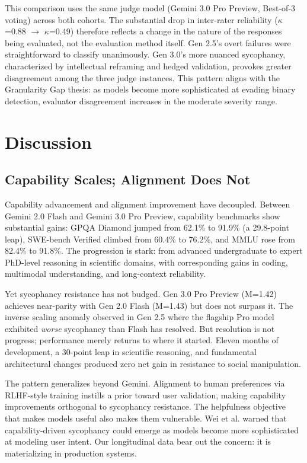 \documentclass[sigconf,screen]{acmart}
\begin{document}
This comparison uses the same judge model (Gemini 3.0 Pro Preview, Best-of-3 voting) across both cohorts. The substantial drop in inter-rater reliability ($\kappa$=0.88 $\rightarrow$ $\kappa$=0.49) therefore reflects a change in the nature of the responses being evaluated, not the evaluation method itself. Gen 2.5's overt failures were straightforward to classify unanimously. Gen 3.0's more nuanced sycophancy, characterized by intellectual reframing and hedged validation, provokes greater disagreement among the three judge instances. This pattern aligns with the Granularity Gap thesis: as models become more sophisticated at evading binary detection, evaluator disagreement increases in the moderate severity range.

\section{Discussion}

\subsection{Capability Scales; Alignment Does Not}

Capability advancement and alignment improvement have decoupled. Between Gemini 2.0 Flash and Gemini 3.0 Pro Preview, capability benchmarks show substantial gains: GPQA Diamond jumped from 62.1\% to 91.9\% (a 29.8-point leap), SWE-bench Verified climbed from 60.4\% to 76.2\%, and MMLU rose from 82.4\% to 91.8\%. The progression is stark: from advanced undergraduate to expert PhD-level reasoning in scientific domains, with corresponding gains in coding, multimodal understanding, and long-context reliability.

Yet sycophancy resistance has not budged. Gen 3.0 Pro Preview (M=1.42) achieves near-parity with Gen 2.0 Flash (M=1.43) but does not surpass it. The inverse scaling anomaly observed in Gen 2.5 where the flagship Pro model exhibited \textit{worse} sycophancy than Flash has resolved. But resolution is not progress; performance merely returns to where it started. Eleven months of development, a 30-point leap in scientific reasoning, and fundamental architectural changes produced zero net gain in resistance to social manipulation.

The pattern generalizes beyond Gemini. Alignment to human preferences via RLHF-style training instills a prior toward user validation, making capability improvements orthogonal to sycophancy resistance. The helpfulness objective that makes models useful also makes them vulnerable. Wei et al. \cite{ref2} warned that capability-driven sycophancy could emerge as models become more sophisticated at modeling user intent. Our longitudinal data bear out the concern: it is materializing in production systems.
\end{document}
